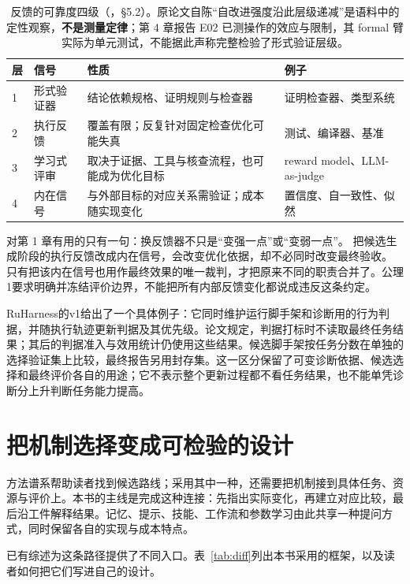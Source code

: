 \begin{table}[htbp]
\centering
\small
\begin{tabular}{@{}p{1.0cm}p{3.0cm}p{5.0cm}p{4.2cm}@{}}
\toprule
层 & 信号 & 性质 & 例子 \\
\midrule
1 & 形式验证器 & 结论依赖规格、证明规则与检查器 & 证明检查器、类型系统 \\
2 & 执行反馈 & 覆盖有限；反复针对固定检查优化可能失真 & 测试、编译器、基准 \\
3 & 学习式评审 & 取决于证据、工具与核查流程，也可能成为优化目标 & reward model、LLM-as-judge \\
4 & 内在信号 & 与外部目标的对应关系需验证；成本随实现变化 & 置信度、自一致性、似然 \\
\bottomrule
\end{tabular}
\caption{反馈的可靠度四级（\cite{rsi-survey-2607}，\S 5.2）。原论文自陈“自改进强度沿此层级递减”是语料中的
定性观察，\textbf{不是测量定律}；第 4 章报告 E02 已测操作的效应与限制，其 formal 臂实际为单元测试，不能据此声称完整检验了形式验证层级。}
\label{tab:verif}
\end{table}

对第 1 章有用的只有一句：换反馈器不只是“变强一点”或“变弱一点”。
把候选生成阶段的执行反馈改成内在信号，会改变优化依据，却不必同时改变最终验收。
只有把该内在信号也用作最终效果的唯一裁判，才把原来不同的职责合并了。公理1要求明确并冻结评价边界，不能把所有内部反馈变化都说成违反这条约定。

RuHarness的v1给出了一个具体例子\cite{ruharness-2610}：它同时维护运行脚手架和诊断用的行为判据，并随执行轨迹更新判据及其优先级。论文规定，判据打标时不读取最终任务结果；其后的判据准入与效用统计仍使用这些结果。候选脚手架按任务分数在单独的选择验证集上比较，最终报告另用封存集。这一区分保留了可变诊断依据、候选选择和最终评价各自的用途；它不表示整个更新过程都不看任务结果，也不能单凭诊断分上升判断任务能力提高。

\section{把机制选择变成可检验的设计}
\label{ch:why}

方法谱系帮助读者找到候选路线；采用其中一种，还需要把机制接到具体任务、资源与评价上。本书的主线是完成这种连接：先指出实际变化，再建立对应比较，最后沿工件解释结果。记忆、提示、技能、工作流和参数学习由此共享一种提问方式，同时保留各自的实现与成本特点。

已有综述为这条路径提供了不同入口。表~\ref{tab:diff}列出本书采用的框架，以及读者如何把它们写进自己的设计。

